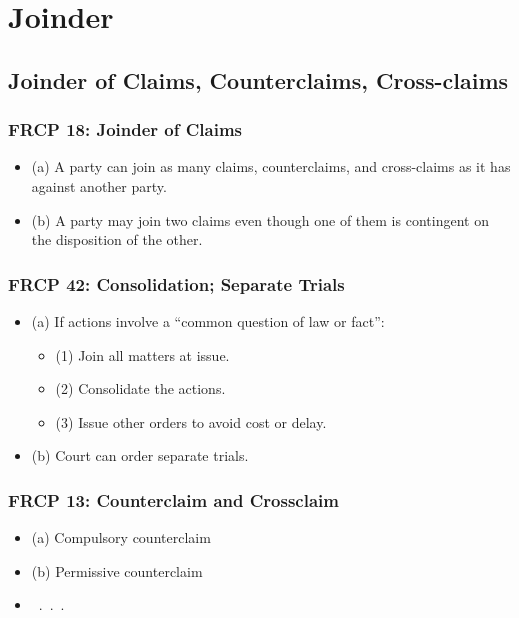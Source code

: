 \section{Joinder}

\subsection{Joinder of Claims, Counterclaims, Cross-claims}

\subsubsection{FRCP 18: Joinder of Claims}

\begin{itemize}
    \item (a) A party can join as many claims, counterclaims, and cross-claims 
    as it has against another party.
    \item (b) A party may join two claims even though one of them is 
    contingent on the disposition of the other.
\end{itemize}

\subsubsection{FRCP 42: Consolidation; Separate Trials}

\begin{itemize}
    \item (a) If actions involve a ``common question of law or fact'':
    \begin{itemize}
        \item (1) Join all matters at issue.
        \item (2) Consolidate the actions.
        \item (3) Issue other orders to avoid cost or delay.
    \end{itemize}
    \item (b) Court can order separate trials.
\end{itemize}

\subsubsection{FRCP 13: Counterclaim and Crossclaim}

\begin{itemize}
    \item (a) Compulsory counterclaim
    \item (b) Permissive counterclaim
    \item ~.~.~.~ %
\end{itemize}


